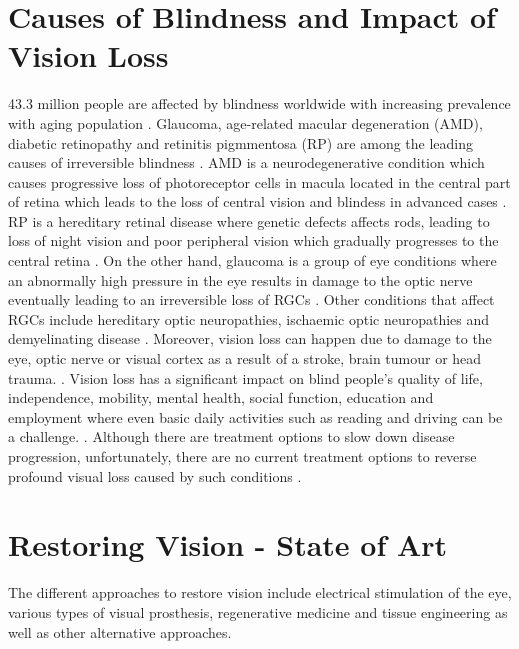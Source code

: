 \section{Causes of Blindness and Impact of Vision Loss }
\label{ch:intro:sec:background:subsec:materials}

43.3 million people are affected by blindness worldwide \cite{bourne2021trends} with increasing prevalence with aging population \cite{sehic2016electrical}. Glaucoma, age-related macular degeneration (AMD), diabetic retinopathy and retinitis pigmmentosa (RP) are among the leading causes of irreversible blindness \cite{sehic2016electrical}. AMD is a neurodegenerative condition which causes progressive loss of photoreceptor cells in macula located in the central part of retina which leads to the loss of central vision and blindess in advanced cases \cite{de2020age}. RP is a hereditary retinal disease where genetic defects affects rods, leading to loss of night vision and poor peripheral vision which gradually progresses to the central retina \cite{sehic2016electrical}. On the other hand, glaucoma is a group of eye conditions where an abnormally high pressure in the eye results in damage to the optic nerve eventually leading to an irreversible loss of RGCs \cite{leskea2004factors}. Other conditions that affect RGCs include hereditary optic neuropathies, ischaemic optic neuropathies and demyelinating disease \cite{khatib2017protecting}. Moreover, vision loss can happen due to damage to the eye, optic nerve or visual cortex as a result of a stroke, brain tumour or head trauma. \cite{atkins2008post}. Vision loss has a significant impact on blind people's quality of life, independence, mobility, mental health, social function, education and employment where even basic daily activities such as reading and driving can be a challenge. \cite{national2017making}. Although there are treatment options to slow down disease progression, unfortunately, there are no current treatment options to reverse profound visual loss caused by such conditions \cite{bloch2019advances}. 

%
\section{Restoring Vision - State of Art}
\label{ch:intro:sec:background:subsec:uptake}
The different approaches to restore vision include electrical stimulation of the eye, various types of visual prosthesis, regenerative medicine and tissue engineering as well as other alternative approaches.

